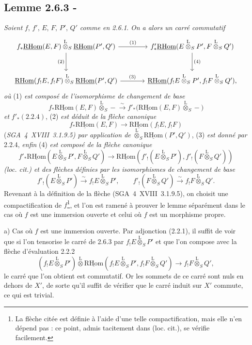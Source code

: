 \documentclass[11pt]{article}
\newcommand{\R}{\mathrm{R}}\newcommand{\RHomCore}{\mathrm{RHom}}
\providecommand{\RHom}{\RHomCore}
\providecommand{\uRHom}{\underline{\RHom}}
\providecommand{\RHom}{\RHomCore}
\providecommand{\RHom}{\R\mathcal{H}om}
\providecommand{\R}{\mathrm R}
\providecommand{\RHom}{\RHomCore}
\begin{document}
\subsection*{Lemme 2.6.3 -}
\emph{Soient} $f$, $f'$, $E$, $F$, $P'$, $Q'$ \emph{comme en 2.6.1}. \emph{On a alors un carré commutatif}
\[
\begin{tikzcd}[column sep=large,row sep=large]
f_*\uRHom(E,F)\overset{\mathrm{L}}{\otimes}_S\uRHom(P',Q') \arrow[r,"(1)"] \arrow[d,"(2)"'] & f'_*\uRHom(E\overset{\mathrm{L}}{\otimes}_SP',F\overset{\mathrm{L}}{\otimes}_SQ') \arrow[d,"(4)"]\\
\uRHom(f_!E,f_!F)\overset{\mathrm{L}}{\otimes}_S\uRHom(P',Q') \arrow[r,"(3)"] & \uRHom(f_!E\overset{\mathrm{L}}{\otimes}_SP',f_!F\overset{\mathrm{L}}{\otimes}_SQ'),
\end{tikzcd}
\]
\emph{où} (1) \emph{est composé de l'isomorphisme de changement de base}
\[
f_*\uRHom(E,F)\overset{\mathrm{L}}{\otimes}_S -\xrightarrow{\sim}f'_*\bigl(\uRHom(E,F)\overset{\mathrm{L}}{\otimes}_S-\bigr)
\]
\emph{et} $f'_*(2.2.4)$, (2) \emph{est déduit de la flèche canonique}
\[
f_*\uRHom(E,F)\longrightarrow\uRHom(f_!E,f_!F)
\]
(\emph{SGA~4~XVIII~3.1.9.5) par application de} $\overset{\mathrm{L}}{\otimes}_S\uRHom(P',Q')$, (3) \emph{est donné par} 2.2.4, \emph{enfin} (4) \emph{est composé de la flèche canonique}
\[
f'_*\uRHom(E\overset{\mathrm{L}}{\otimes}_SP',F\overset{\mathrm{L}}{\otimes}_SQ')
\longrightarrow
\uRHom(f'_!(E\overset{\mathrm{L}}{\otimes}_SP'),f'_!(F\overset{\mathrm{L}}{\otimes}_SQ'))
\]
\emph{(loc. cit.) et des flèches définies par les isomorphismes de changement de base}
\[
f'_!(E\overset{\mathrm{L}}{\otimes}_SP')\xrightarrow{\sim}f_!E\overset{\mathrm{L}}{\otimes}_SP',
\qquad
f'_!(F\overset{\mathrm{L}}{\otimes}_SQ')\xrightarrow{\sim}f_!F\overset{\mathrm{L}}{\otimes}_SQ'.
\]
Revenant à la définition de la flèche (SGA~4~XVIII~3.1.9.5), on choisit une compactification de $f$\footnote{La flèche citée est définie à l'aide d'une telle compactification, mais elle n'en dépend pas : ce point, admis tacitement dans (loc. cit.), se vérifie facilement.}, et l'on est ramené à prouver le lemme séparément dans le cas où $f$ est une immersion ouverte et celui où $f$ est un morphisme propre.

a) Cas où $f$ est une immersion ouverte. Par adjonction (2.2.1), il suffit de voir que si l'on tensorise le carré de 2.6.3 par $f_!E\overset{\mathrm{L}}{\otimes}_SP'$ et que l'on compose avec la flèche d'évaluation 2.2.2
\[
(f_!E\overset{\mathrm{L}}{\otimes}_SP')\overset{\mathrm{L}}{\otimes}\uRHom(f_!E\overset{\mathrm{L}}{\otimes}_SP',f_!F\overset{\mathrm{L}}{\otimes}_SQ')\longrightarrow f_!F\overset{\mathrm{L}}{\otimes}_SQ',
\]
le carré que l'on obtient est commutatif. Or les sommets de ce carré sont nuls en
dehors de $X'$, de sorte qu'il suffit de vérifier que le carré induit sur $X'$ commute, ce qui est trivial.
\end{document}
